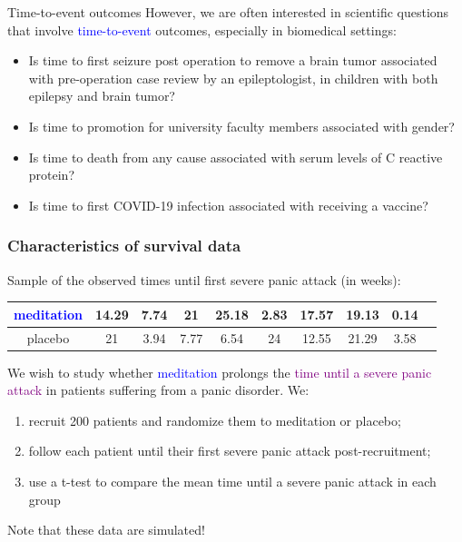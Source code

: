 \documentclass[10pt,t]{beamer}
\begin{document}
\begin{frame}{Time-to-event outcomes}
However, we are often interested in scientific questions that involve \textcolor{blue}{time-to-event} outcomes, especially in biomedical settings:

\medskip

\begin{itemize}
\item Is time to first seizure post operation to remove a brain tumor associated with pre-operation case review by an epileptologist, in children with both epilepsy and brain tumor?

\medskip

\item Is time to promotion for university faculty members associated with gender?

\medskip

\item Is time to death from any cause associated with serum levels of C reactive protein?

\medskip

\item Is time to first COVID-19 infection associated with receiving a vaccine?

\end{itemize}
\end{frame}

\begin{frame}
\frametitle{Characteristics of survival data}
{\fontsize{9pt}{7.2}\selectfont
Sample of the observed times until first severe panic attack (in weeks):

\medskip

\begin{tabular}{|c|c|c|c|c|c|c|c|c|c|}
\hline
\textcolor{blue}{meditation} & 14.29 & 7.74 & 21 & 25.18 & 2.83 & 17.57 & 19.13 & 0.14  \\
\hline
placebo & 21 & 3.94 & 7.77 & 6.54 & 24 & 12.55 & 21.29 & 3.58 \\
\hline
\end{tabular}
}

We wish to study whether \textcolor{blue}{meditation} prolongs the \textcolor{purple}{time until a severe panic attack} in patients suffering from a panic disorder. We:

\medskip

\begin{enumerate}
\item recruit 200 patients and randomize them to meditation or placebo;

\medskip

\item follow each patient until their first severe panic attack post-recruitment;

\medskip

\item use a t-test to compare the mean time until a severe panic attack in each group
\end{enumerate}
\vfill

	Note that these data are simulated!

\end{frame}
\end{document}
